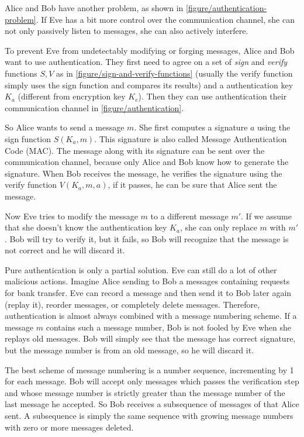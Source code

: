 Alice and Bob have another problem, as shown in \autoref{figure/authentication-problem}. If Eve has a bit more control over the communication channel, she can not only passively listen to messages, she can also actively interfere.

To prevent Eve from undetectably modifying or forging messages, Alice and Bob want to use authentication. They first need to agree on a set of \textit{sign} and \textit{verify} functions $S, V$ as in \autoref{figure/sign-and-verify-functions} (usually the verify function simply uses the sign function and compares its results) and a authentication key $K_a$ (different from encryption key $K_e$). Then they can use authentication their communication channel in \autoref{figure/authentication}.

So Alice wants to send a message $m$. She first computes a signature $a$ using the sign function $S(K_a, m)$. This signature is also called Message Authentication Code (MAC). The message along with its signature can be sent over the communication channel, because only Alice and Bob know how to generate the signature. When Bob receives the message, he verifies the signature using the verify function $V(K_a, m, a)$, if it passes, he can be sure that Alice sent the message.

Now Eve tries to modify the message $m$ to a different message $m'$. If we assume that she doesn't know the authentication key $K_a$, she can only replace $m$ with $m'$. Bob will try to verify it, but it fails, so Bob will recognize that the message is not correct and he will discard it.

Pure authentication is only a partial solution. Eve can still do a lot of other malicious actions. Imagine Alice sending to Bob a messages containing requests for bank transfer. Eve can record a message and then send it to Bob later again (replay it), reorder messages, or completely delete messages. Therefore, authentication is almost always combined with a message numbering scheme. If a message $m$ contains such a message number, Bob is not fooled by Eve when she replays old messages. Bob will simply see that the message has correct signature, but the message number is from an old message, so he will discard it.

The best scheme of message numbering is a number sequence, incrementing by 1 for each message. Bob will accept only messages which passes the verification step and whose message number is strictly greater than the message number of the last message he accepted. So Bob receives a subsequence of messages of that Alice sent. A subsequence is simply the same sequence with growing message numbers with zero or more messages deleted.

